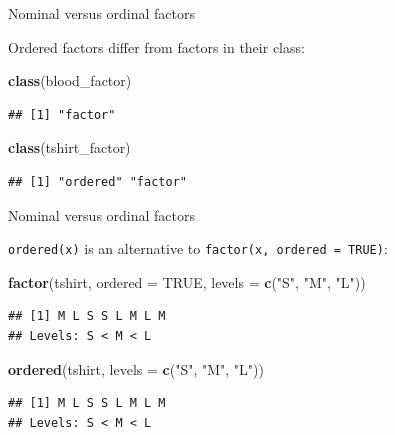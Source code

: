 \documentclass[ignorenonframetext,]{beamer}
\newenvironment{Shaded}{\begin{snugshade}}{\end{snugshade}}
\newcommand{\DataTypeTok}[1]{\textcolor[rgb]{0.13,0.29,0.53}{#1}}
\newcommand{\KeywordTok}[1]{\textcolor[rgb]{0.13,0.29,0.53}{\textbf{#1}}}
\newcommand{\NormalTok}[1]{#1}
\newcommand{\OtherTok}[1]{\textcolor[rgb]{0.56,0.35,0.01}{#1}}
\newcommand{\StringTok}[1]{\textcolor[rgb]{0.31,0.60,0.02}{#1}}
\begin{document}
\begin{frame}[fragile]{Nominal versus ordinal factors}
\protect\hypertarget{nominal-versus-ordinal-factors-3}{}

Ordered factors differ from factors in their class:

\begin{Shaded}
\begin{Highlighting}[]
\KeywordTok{class}\NormalTok{(blood_factor)}
\end{Highlighting}
\end{Shaded}

\begin{verbatim}
## [1] "factor"
\end{verbatim}

\begin{Shaded}
\begin{Highlighting}[]
\KeywordTok{class}\NormalTok{(tshirt_factor)}
\end{Highlighting}
\end{Shaded}

\begin{verbatim}
## [1] "ordered" "factor"
\end{verbatim}

\end{frame}

\begin{frame}[fragile]{Nominal versus ordinal factors}
\protect\hypertarget{nominal-versus-ordinal-factors-4}{}

\texttt{ordered(x)} is an alternative to
\texttt{factor(x,\ ordered\ =\ TRUE)}:

\begin{Shaded}
\begin{Highlighting}[]
\KeywordTok{factor}\NormalTok{(tshirt, }\DataTypeTok{ordered =} \OtherTok{TRUE}\NormalTok{, }
  \DataTypeTok{levels =} \KeywordTok{c}\NormalTok{(}\StringTok{"S"}\NormalTok{, }\StringTok{"M"}\NormalTok{, }\StringTok{"L"}\NormalTok{))}
\end{Highlighting}
\end{Shaded}

\begin{verbatim}
## [1] M L S S L M L M
## Levels: S < M < L
\end{verbatim}

\begin{Shaded}
\begin{Highlighting}[]
\KeywordTok{ordered}\NormalTok{(tshirt, }\DataTypeTok{levels =} \KeywordTok{c}\NormalTok{(}\StringTok{"S"}\NormalTok{, }\StringTok{"M"}\NormalTok{, }\StringTok{"L"}\NormalTok{))}
\end{Highlighting}
\end{Shaded}

\begin{verbatim}
## [1] M L S S L M L M
## Levels: S < M < L
\end{verbatim}

\end{frame}
\end{document}

